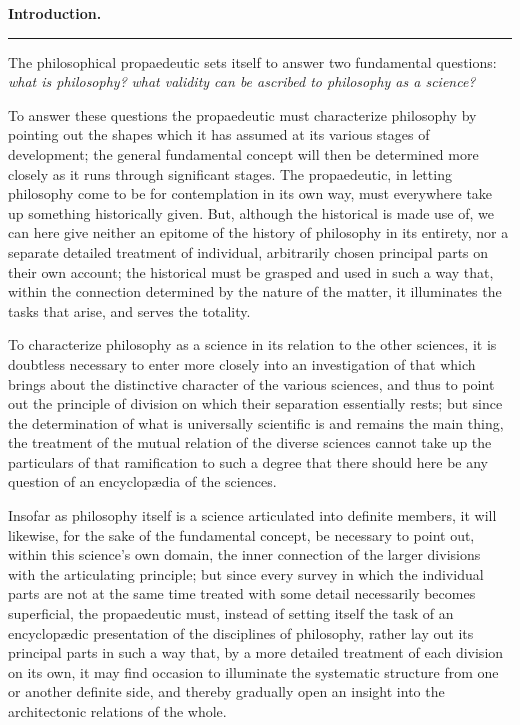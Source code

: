 \documentclass[12pt]{book}
\begin{document}
\tableofcontents
\mainmatter


\begin{center}
  {\Large\bfseries Introduction.}\par\vspace{4pt}
  \rule{2.5cm}{0.4pt}
\end{center}
{}

\noindent The philosophical propaedeutic sets itself to answer two fundamental
questions: \emph{what is philosophy?} \emph{what validity can be ascribed to
philosophy as a science?}

To answer these questions the propaedeutic must characterize philosophy by
pointing out the shapes which it has assumed at its various stages of
development; the general fundamental concept will then be determined more
closely as it runs through significant stages. The propaedeutic, in letting
philosophy come to be for contemplation in its own way, must everywhere take up
something historically given. But, although the historical is made use of, we
can here give neither an epitome of the history of philosophy in its entirety,
nor a separate detailed treatment of individual, arbitrarily chosen principal
parts on their own account; the historical must be grasped and used in such a
way that, within the connection determined by the nature of the matter, it
illuminates the tasks that arise, and serves the totality.

To characterize philosophy as a science in its relation to the other sciences,
it is doubtless necessary to enter more closely into an investigation of that
which brings about the distinctive character of the various sciences, and thus
to point out the principle of division on which their separation essentially
rests; but since the determination of what is universally scientific is and
remains the main thing, the treatment of the mutual relation of the diverse
sciences cannot take up the particulars of that ramification to such a degree
that there should here be any question of an encyclopædia of the sciences.

Insofar as philosophy itself is a science articulated into definite members, it
will likewise, for the sake of the fundamental concept, be necessary to point
out, within this science's own domain, the inner connection of the larger
divisions with the articulating principle; but since every survey in which the
individual parts are not at the same time treated with some detail necessarily
becomes superficial, the propaedeutic must, instead of setting itself the task
of an encyclopædic presentation of the disciplines of philosophy, rather lay out
its principal parts in such a way that, by a more detailed treatment of each
division on its own, it may find occasion to illuminate the systematic structure
from one or another definite side, and thereby gradually open an insight into
the architectonic relations of the whole.
\end{document}
